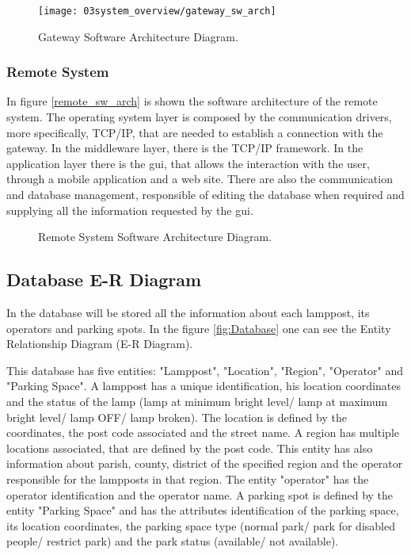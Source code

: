 \begin{figure}[H]
	\centering
	\texttt{[image: 03system\_overview/gateway\_sw\_arch]}
	\caption{Gateway Software Architecture Diagram.}
	\label{fig:gateway_sw_arch}
\end{figure}

\subsubsection{Remote System}
In figure \ref{remote_sw_arch} is shown the software architecture of the remote system. The operating system layer is composed by the communication drivers, more specifically, TCP/IP, that are needed to establish a connection with the gateway. In the middleware layer, there is the TCP/IP framework.
In the application layer there is the \ac{gui}, that allows the interaction with the user, through a mobile application and a web site. There are also the communication and database management, responsible of editing the database when required and supplying all the information requested by the \ac{gui}.

\begin{figure}[H]
	\centering
	\caption{Remote System Software Architecture Diagram.}
	\label{fig:remote_sw_arch}
\end{figure}

\clearpage
\subsection{Database E-R Diagram}
In the database will be stored all the information about each lamppost, its operators and parking spots. In the figure \ref{fig:Database} one can see the Entity Relationship Diagram (E-R Diagram).


This database has five entities: "Lamppost", "Location", "Region", "Operator" and "Parking Space". A lamppost has a unique identification, his location coordinates and the status of the lamp (lamp at minimum bright level/ lamp at maximum bright level/ lamp OFF/ lamp broken). The location is defined by the coordinates, the post code associated and the street name. A region has multiple locations associated, that are defined by the post code. This entity has also information about parish, county, district of the specified region and the operator responsible for the lampposts in that region. The entity "operator" has the operator identification and the operator name. A parking spot is defined by the entity "Parking Space" and has the attributes identification of the parking space, its location coordinates, the parking space type (normal park/ park for disabled people/ restrict park) and the park status (available/ not available).

